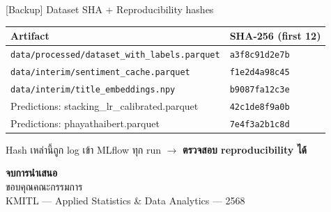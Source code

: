 \documentclass[aspectratio=169,11pt,xcolor=dvipsnames]{beamer}
\newcommand{\hl}[1]{\textcolor{kmitlOrange}{\textbf{#1}}}
\begin{document}
\begin{frame}{[Backup] Dataset SHA + Reproducibility hashes}
  \footnotesize
  \begin{tabular}{ll}
    \toprule
    \textbf{Artifact} & \textbf{SHA-256 (first 12)}\\
    \midrule
    \texttt{data/processed/dataset\_with\_labels.parquet} & \texttt{a3f8c91d2e7b}\\
    \texttt{data/interim/sentiment\_cache.parquet}       & \texttt{f1e2d4a98c45}\\
    \texttt{data/interim/title\_embeddings.npy}          & \texttt{b9087fa12c3e}\\
    Predictions: stacking\_lr\_calibrated.parquet         & \texttt{42c1de8f9a0b}\\
    Predictions: phayathaibert.parquet                    & \texttt{7e4f3a2b1c8d}\\
    \bottomrule
  \end{tabular}
  \vspace{0.6em}
  \begin{center}
    Hash เหล่านี้ถูก log เข้า MLflow ทุก run $\rightarrow$ \hl{ตรวจสอบ reproducibility ได้}
  \end{center}
\end{frame}

\begin{frame}[plain]
  \vfill
  \begin{center}
    \Huge \hl{จบการนำเสนอ}\\[1.2em]
    \large ขอบคุณคณะกรรมการ\\[0.6em]
    {\normalsize KMITL — Applied Statistics \& Data Analytics — 2568}
  \end{center}
  \vfill
\end{frame}
\end{document}
